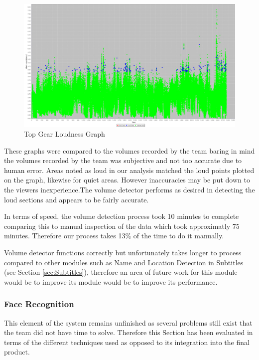 \begin{figure}[h1]
\begin{center}
\includegraphics[trim = 0mm 0mm 0mm 0mm, clip, scale=0.35]{Images/top_gear_volume_graph.jpg}
\caption{Top Gear Loudness Graph}
\end{center}
\end{figure}

These graphs were compared to the volumes recorded by the team baring in mind the volumes recorded by the team was subjective and not too accurate due to human error. Areas noted as loud in our analysis matched the loud points plotted on the graph, likewise for quiet areas. However inaccuracies may be put down to the viewers inexperience.The volume detector performs as desired in detecting the loud sections and appears to be fairly accurate. 

In terms of speed, the volume detection process took 10 minutes to complete comparing this to manual inspection of the data which took approximatly 75 minutes. Therefore our process takes 13\% of the time to do it manually.

Volume detector functions correctly but unfortunately takes longer to process compared to other modules such as Name and Location Detection in Subtitles (see Section \ref{sec:Subtitles}), therefore an area of future work for this module would be to improve its module would be to improve its performance.

\newpage
\subsubsection{Face Recognition}
This element of the system remains unfinished as several problems still exist that the team did not have time to solve. Therefore this Section has been evaluated in terms of the different techniques used as opposed to its integration into the final product. 

